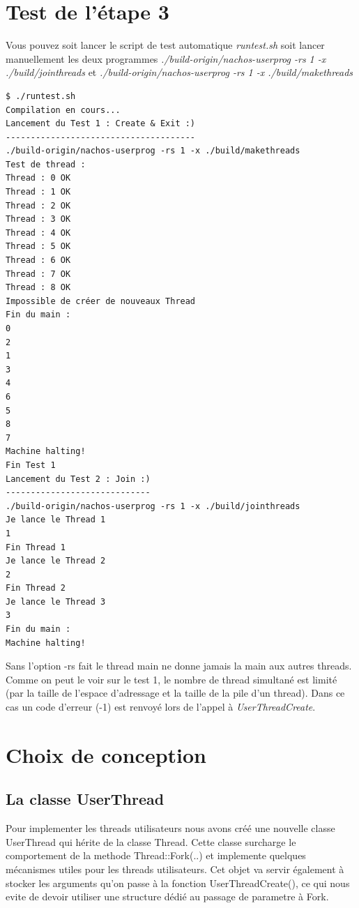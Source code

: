 \documentclass[a4paper,10pt]{article}
\begin{document}
\section{Test de l'étape 3}

Vous pouvez soit lancer le script de test automatique \textit{runtest.sh} soit
lancer manuellement les deux programmes \textit{./build-origin/nachos-userprog
-rs 1 -x ./build/jointhreads} et \textit{./build-origin/nachos-userprog -rs 1 -x
./build/makethreads}

\begin{lstlisting}
$ ./runtest.sh
Compilation en cours...
Lancement du Test 1 : Create & Exit :)
--------------------------------------
./build-origin/nachos-userprog -rs 1 -x ./build/makethreads
Test de thread :
Thread : 0 OK
Thread : 1 OK
Thread : 2 OK
Thread : 3 OK
Thread : 4 OK
Thread : 5 OK
Thread : 6 OK
Thread : 7 OK
Thread : 8 OK
Impossible de créer de nouveaux Thread
Fin du main :
0
2
1
3
4
6
5
8
7
Machine halting!
Fin Test 1
Lancement du Test 2 : Join :)
-----------------------------
./build-origin/nachos-userprog -rs 1 -x ./build/jointhreads
Je lance le Thread 1
1
Fin Thread 1
Je lance le Thread 2
2
Fin Thread 2
Je lance le Thread 3
3
Fin du main :
Machine halting!
\end{lstlisting}

Sans l'option -rs fait le thread  main ne donne jamais la main aux autres
threads. Comme on peut le voir sur le test 1, le nombre de thread simultané
est limité (par la taille de l'espace d'adressage et la taille de la
pile d'un thread). Dans ce cas un code d'erreur (-1) est renvoyé lors de
l'appel à \textit{UserThreadCreate}.

\section{Choix de conception}

\subsection{La classe UserThread}
Pour implementer les threads utilisateurs nous avons créé une nouvelle classe
UserThread qui hérite de la classe Thread. Cette classe surcharge le
comportement de la methode Thread::Fork(..) et implemente quelques mécanismes
utiles pour les threads utilisateurs. Cet objet va servir également à stocker
les arguments qu'on passe à la fonction UserThreadCreate(), ce qui nous evite
de devoir utiliser une structure dédié au passage de parametre à Fork.
\end{document}
